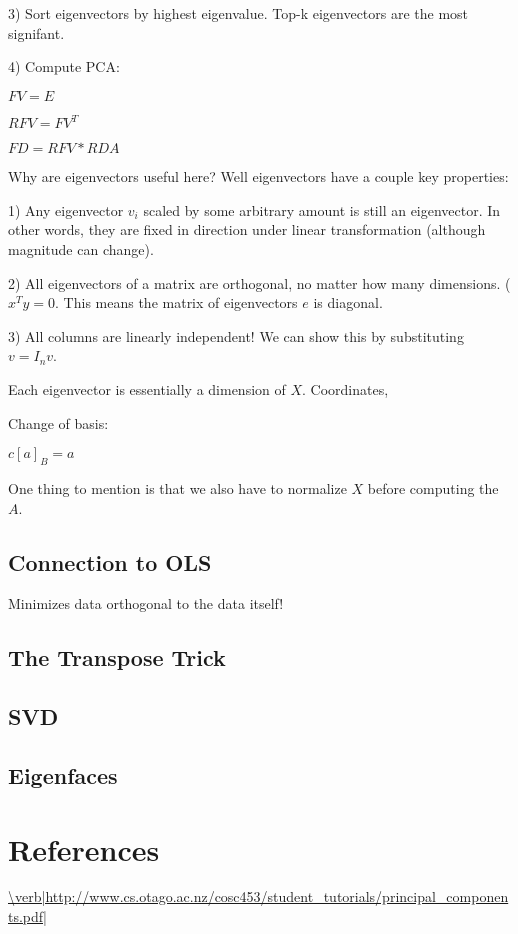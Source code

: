 \documentclass[11pt]{article}
\theoremstyle{plain}
\theoremstyle{definition}
\begin{document}
3) Sort eigenvectors by highest eigenvalue. Top-k eigenvectors are the most signifant.

4) Compute PCA:

$FV = E$

$RFV = FV^T$

$FD = RFV * RDA$

Why are eigenvectors useful here? Well eigenvectors have a couple key properties:

1) Any eigenvector $v_i$ scaled by some arbitrary amount is still an eigenvector. In other words, they are fixed in direction under linear transformation (although magnitude can change).

2) All eigenvectors of a matrix are orthogonal, no matter how many dimensions. ($x^Ty = 0$. This means the matrix of eigenvectors $e$ is diagonal.

3) All columns are linearly independent! We can show this by substituting $v = I_n v$.



Each eigenvector is essentially a dimension of $X$. Coordinates,

Change of basis:

$c[a]_B = a$

One thing to mention is that we also have to normalize $X$ before computing the $A$.

\subsection{Connection to OLS}

Minimizes data orthogonal to the data itself!
\subsection{The Transpose Trick}

\subsection{SVD}

\subsection{Eigenfaces}

\section{References}

 \url{\verb|http://www.cs.otago.ac.nz/cosc453/student_tutorials/principal_components.pdf|}
  
\end{document}
